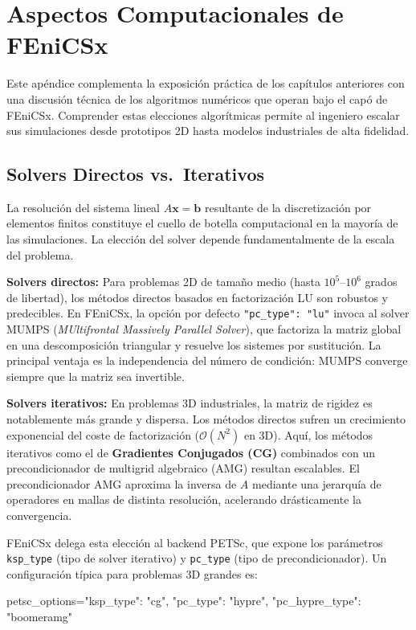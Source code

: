 \chapter{Aspectos Computacionales de FEniCSx}
\label{app:fenics}

Este apéndice complementa la exposición práctica de los capítulos anteriores con una discusión técnica de los algoritmos numéricos que operan bajo el capó de FEniCSx. Comprender estas elecciones algorítmicas permite al ingeniero escalar sus simulaciones desde prototipos 2D hasta modelos industriales de alta fidelidad.

\section{Solvers Directos vs.~Iterativos}

La resolución del sistema lineal $A\bm{x} = \bm{b}$ resultante de la discretización por elementos finitos constituye el cuello de botella computacional en la mayoría de las simulaciones. La elección del solver depende fundamentalmente de la escala del problema.

\textbf{Solvers directos:} Para problemas 2D de tamaño medio (hasta $10^5$--$10^6$ grados de libertad), los métodos directos basados en factorización LU son robustos y predecibles. En FEniCSx, la opción por defecto \texttt{"pc\_type": "lu"} invoca al solver MUMPS (\textit{MUltifrontal Massively Parallel Solver}), que factoriza la matriz global en una descomposición triangular y resuelve los sistemes por sustitución. La principal ventaja es la independencia del número de condición: MUMPS converge siempre que la matriz sea invertible.

\textbf{Solvers iterativos:} En problemas 3D industriales, la matriz de rigidez es notablemente más grande y dispersa. Los métodos directos sufren un crecimiento exponencial del coste de factorización ($\mathcal{O}(N^2)$ en 3D). Aquí, los métodos iterativos como el de \textbf{Gradientes Conjugados (CG)} combinados con un precondicionador de multigrid algebraico (AMG) resultan escalables. El precondicionador AMG aproxima la inversa de $A$ mediante una jerarquía de operadores en mallas de distinta resolución, acelerando drásticamente la convergencia.

FEniCSx delega esta elección al backend PETSc, que expone los parámetros \texttt{ksp\_type} (tipo de solver iterativo) y \texttt{pc\_type} (tipo de precondicionador). Un configuración típica para problemas 3D grandes es:
\begin{codigo}[language=Python]
petsc_options={"ksp_type": "cg", "pc_type": "hypre", "pc_hypre_type": "boomeramg"}
\end{codigo}


